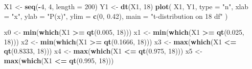 \documentclass[
]{book}
\newenvironment{Shaded}{\begin{snugshade}}{\end{snugshade}}
\newcommand{\DataTypeTok}[1]{\textcolor[rgb]{0.13,0.29,0.53}{#1}}
\newcommand{\DecValTok}[1]{\textcolor[rgb]{0.00,0.00,0.81}{#1}}
\newcommand{\FloatTok}[1]{\textcolor[rgb]{0.00,0.00,0.81}{#1}}
\newcommand{\KeywordTok}[1]{\textcolor[rgb]{0.13,0.29,0.53}{\textbf{#1}}}
\newcommand{\NormalTok}[1]{#1}
\newcommand{\OperatorTok}[1]{\textcolor[rgb]{0.81,0.36,0.00}{\textbf{#1}}}
\newcommand{\StringTok}[1]{\textcolor[rgb]{0.31,0.60,0.02}{#1}}
\begin{document}
\begin{Shaded}
\begin{Highlighting}[]
\NormalTok{X1 <-}\StringTok{ }\KeywordTok{seq}\NormalTok{(}\OperatorTok{-}\DecValTok{4}\NormalTok{, }\DecValTok{4}\NormalTok{, }\DataTypeTok{length =} \DecValTok{200}\NormalTok{)}
\NormalTok{Y1 <-}\StringTok{ }\KeywordTok{dt}\NormalTok{(X1, }\DecValTok{18}\NormalTok{)}
\KeywordTok{plot}\NormalTok{(}
\NormalTok{  X1,}
\NormalTok{  Y1,}
  \DataTypeTok{type =} \StringTok{"n"}\NormalTok{,}
  \DataTypeTok{xlab =} \StringTok{"x"}\NormalTok{,}
  \DataTypeTok{ylab =} \StringTok{"P(x)"}\NormalTok{,}
  \DataTypeTok{ylim =} \KeywordTok{c}\NormalTok{(}\DecValTok{0}\NormalTok{, }\FloatTok{0.42}\NormalTok{),}
  \DataTypeTok{main =} \StringTok{"t-distribution on 18 df"}
\NormalTok{)}

\NormalTok{x0 <-}\StringTok{ }\KeywordTok{min}\NormalTok{(}\KeywordTok{which}\NormalTok{(X1 }\OperatorTok{>=}\StringTok{ }\KeywordTok{qt}\NormalTok{(}\FloatTok{0.005}\NormalTok{, }\DecValTok{18}\NormalTok{)))}
\NormalTok{x1 <-}\StringTok{ }\KeywordTok{min}\NormalTok{(}\KeywordTok{which}\NormalTok{(X1 }\OperatorTok{>=}\StringTok{ }\KeywordTok{qt}\NormalTok{(}\FloatTok{0.025}\NormalTok{, }\DecValTok{18}\NormalTok{)))}
\NormalTok{x2 <-}\StringTok{ }\KeywordTok{min}\NormalTok{(}\KeywordTok{which}\NormalTok{(X1 }\OperatorTok{>=}\StringTok{ }\KeywordTok{qt}\NormalTok{(}\FloatTok{0.1666}\NormalTok{, }\DecValTok{18}\NormalTok{)))}
\NormalTok{x3 <-}\StringTok{ }\KeywordTok{max}\NormalTok{(}\KeywordTok{which}\NormalTok{(X1 }\OperatorTok{<=}\StringTok{ }\KeywordTok{qt}\NormalTok{(}\FloatTok{0.8333}\NormalTok{, }\DecValTok{18}\NormalTok{)))}
\NormalTok{x4 <-}\StringTok{ }\KeywordTok{max}\NormalTok{(}\KeywordTok{which}\NormalTok{(X1 }\OperatorTok{<=}\StringTok{ }\KeywordTok{qt}\NormalTok{(}\FloatTok{0.975}\NormalTok{, }\DecValTok{18}\NormalTok{)))}
\NormalTok{x5 <-}\StringTok{ }\KeywordTok{max}\NormalTok{(}\KeywordTok{which}\NormalTok{(X1 }\OperatorTok{<=}\StringTok{ }\KeywordTok{qt}\NormalTok{(}\FloatTok{0.995}\NormalTok{, }\DecValTok{18}\NormalTok{)))}


\end{Highlighting}
\end{Shaded}
\end{document}
